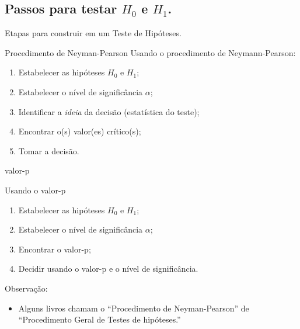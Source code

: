 \documentclass[8pt]{beamer}
\begin{document}
\subsection{Passos para testar $H_0$ e $H_1$.}

\begin{frame}{Etapas para construir em um Teste de Hipóteses.}

\normalsize

\begin{block}{Procedimento de Neyman-Pearson}
 Usando o procedimento de Neymann-Pearson:
 \begin{enumerate}[1)]
  \item Estabelecer as hipóteses $H_0$ e $H_1$;
  \vfill
  
  \item Estabelecer o nível de significância $\alpha$;
  \vfill
  
  \item Identificar a \textit{ideia} da decisão (estatística do teste);
  \vfill
  
  \item Encontrar o(s) valor(es) crítico(s);
  \vfill
  
  \item Tomar a decisão.
 \end{enumerate}
\end{block}

\begin{block}{valor-p}
 
 Usando o valor-p
 \begin{enumerate}[1)]
    \item Estabelecer as hipóteses $H_0$ e $H_1$;
  \vfill
  
  \item Estabelecer o nível de significância $\alpha$;
  \vfill
  
  \item Encontrar o valor-p;
  \vfill
  
  \item Decidir usando o valor-p e o nível de significância.
 \end{enumerate}
\end{block}

Observação:
\begin{itemize}
	\item Alguns livros chamam o ``Procedimento de Neyman-Pearson'' de ``Procedimento Geral de Testes de hipóteses.''
\end{itemize}



\normalsize
\end{frame}
\end{document}
